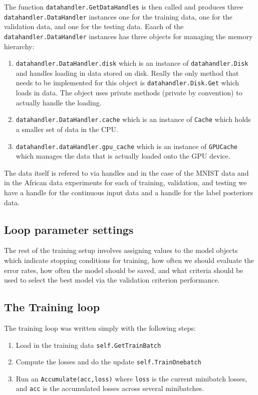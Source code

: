\documentclass{article} %
\begin{document}
The function \texttt{datahandler.GetDataHandles} is then called and produces three \texttt{datahandler.DataHandler} instances
one for the training data, one for the validation data, and one for the testing data.  Eaach of the \texttt{datahandler.DataHandler}
instances has three objects for managing the memory hierarchy:
\begin{enumerate}
\item \texttt{datahandler.DataHandler.disk} which is an instance of \texttt{datahandler.Disk} and handles loading in data stored on disk. Really the only method that needs to be implemented for this object is \texttt{datahandler.Disk.Get} which loads in data.  The object uses
private methods (private by convention) to actually handle the loading.
\item \texttt{datahandler.DataHandler.cache} which is an instance of \texttt{Cache} which holds a smaller set of data in the CPU.
\item \texttt{datahandler.dataHandler.gpu\_cache} which is an instance of \texttt{GPUCache} which manages the data that is actually loaded
onto the GPU device.
\end{enumerate}
The data itself is refered to via handles and in the case of the MNIST data and in the African data experiments for each of
training, validation, and testing we have a handle for the continuous input data and a handle for the label posteriors data.

\subsection{Loop parameter settings}

The rest of the training setup involves assigning values to the model objects which indicate stopping conditions for training, how often
we should evaluate the error rates, how often the model should be saved, and what criteria should be used to select the best model
via the validation criterion performance.

\subsection{The Training loop}

The training loop was written simply with the following steps:
\begin{enumerate}
\item Load in the training data \texttt{self.GetTrainBatch}
\item Compute the losses and do the update \texttt{self.TrainOnebatch}
\item Run an \texttt{Accumulate(acc,loss)} where \texttt{loss} is the current minibatch losses, and \texttt{acc} is the accumulated losses across several minibatches.
\end{enumerate}
\end{document}
